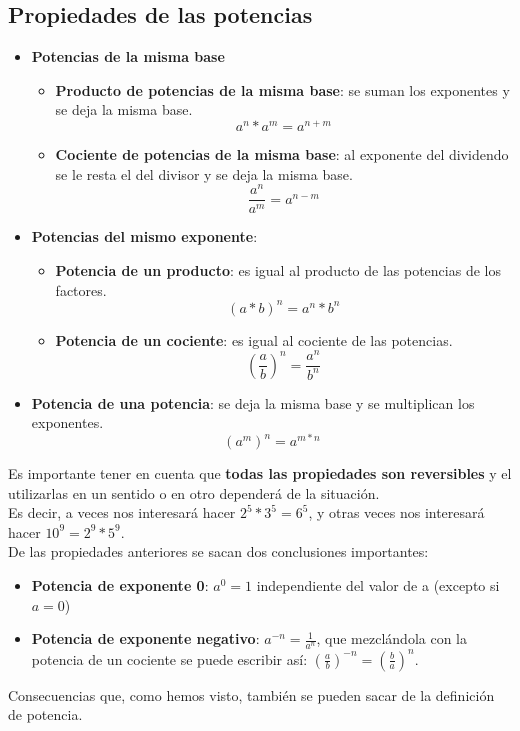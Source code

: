 \documentclass[a4paper,11pt,answers]{exam}
\begin{document}
\subsection{Propiedades de las potencias}
\begin{itemize}
	\item \textbf{Potencias de la misma base}
	\begin{itemize}
	
		\item \textbf{Producto de potencias de la misma base}: se suman los exponentes y se deja la misma base.\\
		\[a^n * a^m = a^{n+m}\]
		\item \textbf{Cociente de potencias de la misma base}: al exponente del dividendo se le resta el del divisor y se deja la misma base.\\
	\[\frac{a^n}{a^m} = a^{n-m}\]
	\end{itemize}
	\item \textbf{Potencias del mismo exponente}: 
	\begin{itemize}	
		\item \textbf{Potencia de un producto}: es igual al producto de las potencias de los factores.\\
		\[(a*b)^n = a^n * b^n\]
		\item \textbf{Potencia de un cociente}: es igual al cociente de las potencias.\\
		\[\left(\frac{a}{b} \right)^n = \frac{a^n}{b^n}\]
	 \end{itemize}
	 \item \textbf{Potencia de una potencia}: se deja la misma base y se multiplican los exponentes.\\
	\[\left(a^m \right)^n = a^{m*n}\]
\end{itemize}
Es importante tener en cuenta que \textbf{todas las propiedades son reversibles} y el utilizarlas en un sentido o en otro dependerá de la situación.\\
Es decir, a veces nos interesará hacer $2^5 * 3^5 = 6^5$, y otras veces nos interesará hacer $10^9  = 2^9 * 5^9$.\\

De las propiedades anteriores se sacan dos conclusiones importantes:
\begin{itemize}
	\item \textbf{Potencia de exponente 0}: $a^0 = 1$ independiente del valor de a (excepto si $a=0$)
	\item \textbf{Potencia de exponente negativo}: $a^{-n} = \frac{1}{a^n}$, que mezclándola con la potencia de un cociente se puede escribir así:
	$\left(\frac{a}{b} \right)^{-n} = \left(\frac{b}{a} \right)^{n}$.
\end{itemize}
Consecuencias que, como hemos visto, también se pueden sacar de la definición de potencia.
\end{document}
